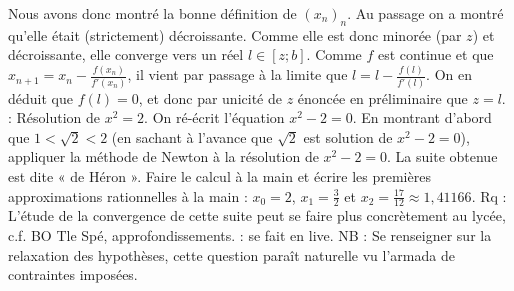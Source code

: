 {}Nous avons donc montré la bonne définition de $\left(x_n\right)_n$. Au passage on a montré qu'elle était (strictement) décroissante. Comme elle est donc minorée (par $z$) et décroissante, elle converge vers un réel $l \in [z;b]$. Comme $f$ est continue et que $x_{n+1} = x_n - \frac{f(x_n)}{f'(x_n)}$, il vient par passage à la limite que $l = l - \frac{f(l)}{f'(l)}$. On en déduit que $f(l) = 0$, et donc par unicité de $z$ énoncée en préliminaire que $z=l$.\markdownRendererInterblockSeparator
{}\shortcutApplication{} : Résolution de $x^2=2$. On ré-écrit l'équation $x^2-2=0$. En montrant d'abord que $1 < \sqrt 2 < 2$ (en sachant à l'avance que $\sqrt 2$ est solution de $x^2-2=0$), appliquer la méthode de Newton à la résolution de $x^2-2=0$.\markdownRendererInterblockSeparator
{}La suite obtenue est dite « de Héron ». Faire le calcul à la main et écrire les premières approximations rationnelles à la main : $x_0=2$, $x_1=\frac{3}{2}$ et $x_2 = \frac{17}{12} \approx 1,41166$.\markdownRendererInterblockSeparator
{}Rq : L'étude de la convergence de cette suite peut se faire plus concrètement au lycée, c.f. BO Tle Spé, approfondissements.\markdownRendererInterblockSeparator
{} : se fait en live.\markdownRendererInterblockSeparator
{}NB : Se renseigner sur la relaxation des hypothèses, cette question paraît naturelle vu l'armada de contraintes imposées.\markdownRendererDocumentEnd